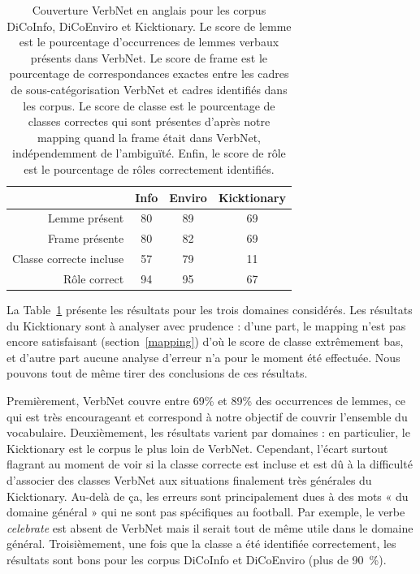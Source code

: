 \begin{table}[h]
\centering
\begin{tabular}{rccc}
  \toprule
         & Info & Enviro & Kicktionary \\
  \midrule
  Lemme présent           & 80 & 89 & 69 \\
  Frame présente          & 80 & 82 & 69 \\
  Classe correcte incluse & 57 & 79 & 11 \\
  Rôle correct            & 94 & 95 & 67 \\
  \bottomrule
\end{tabular}

\caption{\label{table:coverage} Couverture VerbNet en anglais pour les corpus
    DiCoInfo, DiCoEnviro et Kicktionary. Le score de lemme est le pourcentage
    d'occurrences de lemmes verbaux présents dans VerbNet. Le score de frame
    est le pourcentage de correspondances exactes entre les cadres de
    sous-catégorisation VerbNet et cadres identifiés dans les corpus. Le score
    de classe est le pourcentage de classes correctes qui sont présentes
    d'après notre mapping quand la frame était dans VerbNet, indépendemment de
l'ambiguïté. Enfin, le score de rôle est le pourcentage de rôles correctement
identifiés.}

\end{table}

La Table~\ref{table:coverage} présente les résultats pour les trois domaines
considérés. Les résultats du Kicktionary sont à analyser avec prudence : d'une
part, le mapping n'est pas encore satisfaisant (section~\ref{mapping}) d'où le
score de classe extrêmement bas, et d'autre part aucune analyse d'erreur n'a
pour le moment été effectuée. Nous pouvons tout de même tirer des conclusions
de ces résultats.

Premièrement, VerbNet couvre entre 69\% et 89\% des occurrences de lemmes, ce
qui est très encourageant et correspond à notre objectif de couvrir l'ensemble
du vocabulaire. Deuxièmement, les résultats varient par domaines : en
particulier, le Kicktionary est le corpus le plus loin de VerbNet. Cependant,
l'écart surtout flagrant au moment de voir si la classe correcte est incluse et
est dû à la difficulté d'associer des classes VerbNet aux situations finalement
très générales du Kicktionary. Au-delà de ça, les erreurs sont principalement
dues à des mots « du domaine général » qui ne sont pas spécifiques au football.
Par exemple, le verbe \textit{celebrate} est absent de VerbNet mais il serait
tout de même utile dans le domaine général. Troisièmement, une fois que la
classe a été identifiée correctement, les résultats sont bons pour les corpus
DiCoInfo et DiCoEnviro (plus de 90~\%).


